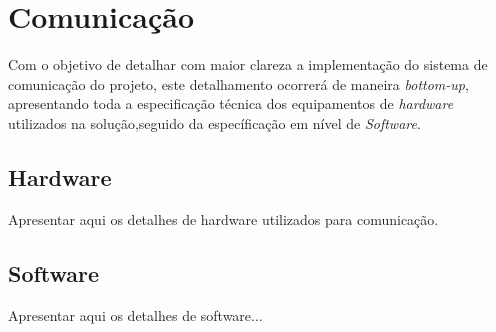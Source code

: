 \section{Comunicação} %
\label{sec:comunicação2}

	Com o objetivo de detalhar com maior clareza a implementação do sistema de comunicação do projeto, este detalhamento ocorrerá de maneira \textit{bottom-up}, apresentando toda a especificação técnica dos equipamentos de \textit{hardware} utilizados na solução,seguido da específicação em nível de \textit{Software}.

	\subsection{Hardware} %
	\label{sub:hardware}
		
		Apresentar aqui os detalhes de hardware utilizados para comunicação.

	\subsection{Software} %
	\label{sub:software}
		
		Apresentar aqui os detalhes de software...
